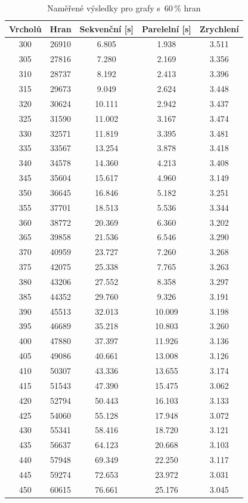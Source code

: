 \documentclass[12pt]{article}
\begin{document}
\begin{table}[H]
\begin{center}
\begin{tabular}{ c c c c c }
\toprule
Vrcholů & Hran & Sekvenční [s] & Parelelní [s] & Zrychlení\\\midrule
300 & 26910 & 6.805 & 1.938 & 3.511\\
305 & 27816 & 7.280 & 2.169 & 3.356\\
310 & 28737 & 8.192 & 2.413 & 3.396\\
315 & 29673 & 9.049 & 2.624 & 3.448\\
320 & 30624 & 10.111 & 2.942 & 3.437\\
325 & 31590 & 11.002 & 3.167 & 3.474\\
330 & 32571 & 11.819 & 3.395 & 3.481\\
335 & 33567 & 13.254 & 3.878 & 3.418\\
340 & 34578 & 14.360 & 4.213 & 3.408\\
345 & 35604 & 15.617 & 4.960 & 3.149\\
350 & 36645 & 16.846 & 5.182 & 3.251\\
355 & 37701 & 18.513 & 5.536 & 3.344\\
360 & 38772 & 20.369 & 6.360 & 3.202\\
365 & 39858 & 21.536 & 6.546 & 3.290\\
370 & 40959 & 23.727 & 7.260 & 3.268\\
375 & 42075 & 25.338 & 7.765 & 3.263\\
380 & 43206 & 27.552 & 8.358 & 3.297\\
385 & 44352 & 29.760 & 9.326 & 3.191\\
390 & 45513 & 32.013 & 10.009 & 3.198\\
395 & 46689 & 35.218 & 10.803 & 3.260\\
400 & 47880 & 37.397 & 11.926 & 3.136\\
405 & 49086 & 40.661 & 13.008 & 3.126\\
410 & 50307 & 43.336 & 13.655 & 3.174\\
415 & 51543 & 47.390 & 15.475 & 3.062\\
420 & 52794 & 50.443 & 16.103 & 3.133\\
425 & 54060 & 55.128 & 17.948 & 3.072\\
430 & 55341 & 58.416 & 18.720 & 3.121\\
435 & 56637 & 64.123 & 20.668 & 3.103\\
440 & 57948 & 69.349 & 22.250 & 3.117\\
445 & 59274 & 72.653 & 23.972 & 3.031\\
450 & 60615 & 76.661 & 25.176 & 3.045\\
\bottomrule
\end{tabular}
\end{center}
\caption{Naměřené výsledky pro grafy s~$60\,\%$ hran} 
\end{table}
\end{document}
